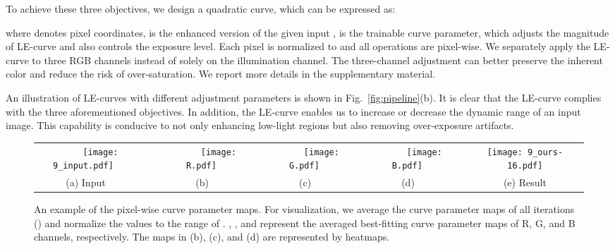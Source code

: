 \documentclass[10pt,twocolumn,letterpaper]{article}
\begin{document}
To achieve these three objectives, we design a quadratic curve, which can be expressed as:

where  denotes pixel coordinates,  is the enhanced version of the given input ,  is the trainable curve parameter, which adjusts the magnitude of LE-curve and also controls the exposure level. Each pixel is normalized to  and all operations are pixel-wise.
We separately apply the LE-curve to three RGB channels instead of solely on the illumination channel. The three-channel adjustment can better preserve the inherent color and reduce the risk of over-saturation. We report more details in the supplementary material.




An illustration of LE-curves with different adjustment parameters  is shown in Fig.~\ref{fig:pipeline}(b).
It is clear that the LE-curve complies with the three aforementioned objectives.
In addition, the LE-curve enables us to increase or decrease the dynamic range of an input image. This capability is conducive to not only enhancing low-light regions but also removing over-exposure artifacts.



\begin{figure*}
	\begin{center}
		\begin{tabular}{c@{ }c@{ }c@{ }c@{ }c@{ }c}
			\texttt{[image: 9\_input.pdf]}~~~~~~~&
			\texttt{[image: R.pdf]}~~~~~~~&
			\texttt{[image: G.pdf]}~~~~~~~&
			\texttt{[image: B.pdf]}~~~~~~~&
			\texttt{[image: 9\_ours-16.pdf]}\\
			(a) Input~~~~~~& (b) ~~~~~~& (c) ~~~~~~& (d) ~~~~~~& (e) Result \\
		\end{tabular}
	\end{center}
	\vspace{-0.5cm}
	\caption{An example of the pixel-wise curve parameter maps. For visualization, we average the curve parameter maps of all iterations () and normalize the values to the range of . , , and  represent the averaged best-fitting curve parameter maps of R, G, and B channels, respectively. The maps in (b), (c), and (d) are represented by heatmaps.}
	\label{fig:map}
	\vspace{-0.2cm}
\end{figure*}
\end{document}
